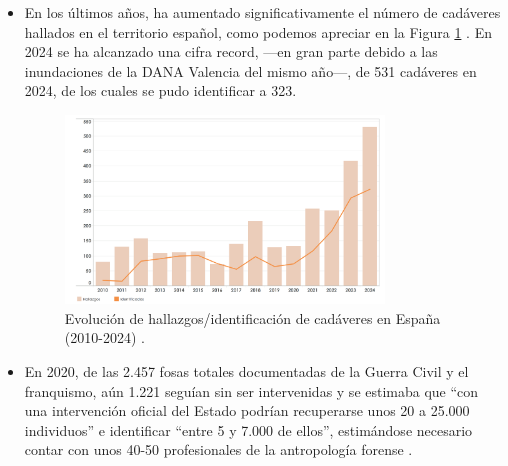 
\begin{itemize}

    \item En los últimos años, ha aumentado significativamente el número de cadáveres hallados en el territorio español, como podemos apreciar en la Figura \ref{fig:evolucion_hallazgosID_cadaveres} \cite{interior2025desaparecidos}. En 2024 se ha alcanzado una cifra record, ---en gran parte debido a las inundaciones de la DANA Valencia del mismo año---, de 531 cadáveres en 2024, de los cuales se pudo identificar a 323.

    \begin{figure}[h]
        \centering
        \includegraphics[width=0.8\textwidth]{capitulos/cap_01/imagenes/hallazgos_cadaveres.png}
        \caption[
            Evolución de hallazgos/identificación de cadáveres en España (2010-2024).
        ]{
            Evolución de hallazgos/identificación de cadáveres en España (2010-2024) \cite{interior2025desaparecidos}. 
        } 
        \label{fig:evolucion_hallazgosID_cadaveres}
    \end{figure}

    \item En 2020, de las 2.457 fosas totales documentadas de la Guerra Civil y el franquismo, aún 1.221 seguían sin ser intervenidas y se estimaba que ``con una intervención oficial del Estado podrían recuperarse unos 20 a 25.000 individuos'' e identificar ``entre 5 y 7.000 de ellos'', estimándose  necesario contar con unos 40-50 profesionales de la antropología forense \cite{etxeberria2020}. 



\end{itemize}
